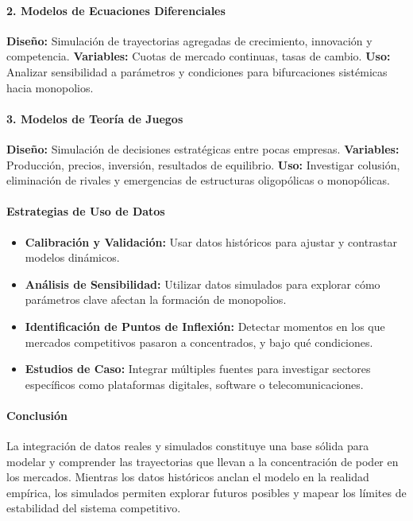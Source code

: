\documentclass[a4paper,12pt]{article}
\begin{document}
\begin{itemize}
    \paragraph{2. Modelos de Ecuaciones Diferenciales} 
    \textbf{Diseño:} Simulación de trayectorias agregadas de crecimiento, innovación y competencia.  
    \textbf{Variables:} Cuotas de mercado continuas, tasas de cambio.  
    \textbf{Uso:} Analizar sensibilidad a parámetros y condiciones para bifurcaciones sistémicas hacia monopolios.

    \paragraph{3. Modelos de Teoría de Juegos} 
    \textbf{Diseño:} Simulación de decisiones estratégicas entre pocas empresas.  
    \textbf{Variables:} Producción, precios, inversión, resultados de equilibrio.  
    \textbf{Uso:} Investigar colusión, eliminación de rivales y emergencias de estructuras oligopólicas o monopólicas.

\end{itemize}

\paragraph{Estrategias de Uso de Datos}
\begin{itemize}
    \item \textbf{Calibración y Validación:} Usar datos históricos para ajustar y contrastar modelos dinámicos.
    \item \textbf{Análisis de Sensibilidad:} Utilizar datos simulados para explorar cómo parámetros clave afectan la formación de monopolios.
    \item \textbf{Identificación de Puntos de Inflexión:} Detectar momentos en los que mercados competitivos pasaron a concentrados, y bajo qué condiciones.
    \item \textbf{Estudios de Caso:} Integrar múltiples fuentes para investigar sectores específicos como plataformas digitales, software o telecomunicaciones.
\end{itemize}

\paragraph{Conclusión} La integración de datos reales y simulados constituye una base sólida para modelar y comprender las trayectorias que llevan a la concentración de poder en los mercados. Mientras los datos históricos anclan el modelo en la realidad empírica, los simulados permiten explorar futuros posibles y mapear los límites de estabilidad del sistema competitivo.
\end{document}

